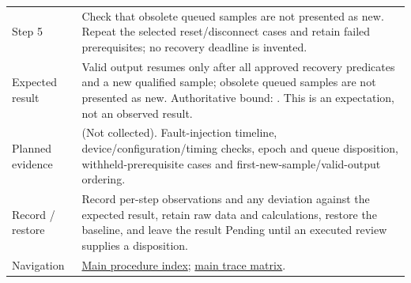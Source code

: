 \begin{tabularx}{\linewidth}{L{3.2cm}Y}
Step 5 & Check that obsolete queued samples are not presented as new. Repeat the selected reset/disconnect cases and retain failed prerequisites; no recovery deadline is invented.\\
Expected result & Valid output resumes only after all approved recovery predicates and a new qualified sample; obsolete queued samples are not presented as new. Authoritative bound: . This is an expectation, not an observed result.\\
Planned evidence &  (Not collected). Fault-injection timeline, device/configuration/timing checks, epoch and queue disposition, withheld-prerequisite cases and first-new-sample/valid-output ordering.\\
Record / restore & Record per-step observations and any deviation against the expected result, retain raw data and calculations, restore the baseline, and leave the result Pending until an executed review supplies a disposition.\\
Navigation & \hyperref[Table:WeekTwoTests]{Main procedure index}; \hyperref[Table:TraceabilityMatrix]{main trace matrix}.\\
\end{tabularx}
\normalsize
